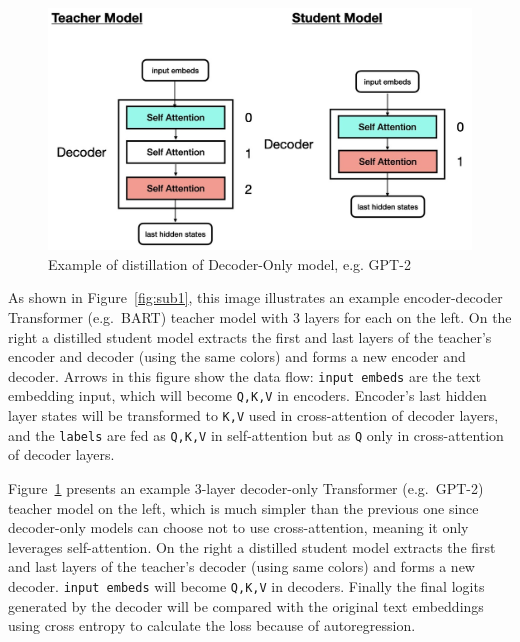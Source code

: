 \begin{figure}[hbpt]
    \centering
    \includegraphics[width=0.9\linewidth]{images/0.002}
    \caption{Example of distillation of Decoder-Only model, e.g. GPT-2}
    \label{fig:sub2}
\end{figure}

As shown in Figure~\ref{fig:sub1}, this image illustrates an example encoder-decoder Transformer (e.g.\ BART) teacher model with 3 layers for each on the left. On the right a distilled student model extracts the first and last layers of the teacher's encoder and decoder (using the same colors) and forms a new encoder and decoder. Arrows in this figure show the data flow: \texttt{input embeds} are the text embedding input, which will become \texttt{Q,K,V} in encoders. Encoder's last hidden layer states will be transformed to \texttt{K,V} used in cross-attention of decoder layers, and the \texttt{labels} are fed as \texttt{Q,K,V} in self-attention but as \texttt{Q} only in cross-attention of decoder layers.

Figure~\ref{fig:sub2} presents an example 3-layer decoder-only Transformer (e.g.\ GPT-2) teacher model on the left, which is much simpler than the previous one since decoder-only models can choose not to use cross-attention, meaning it only leverages self-attention. On the right a distilled student model extracts the first and last layers of the teacher's decoder (using same colors) and forms a new decoder. \texttt{input embeds} will become \texttt{Q,K,V} in decoders. Finally the final logits generated by the decoder will be compared with the original text embeddings using cross entropy to calculate the loss because of autoregression.


